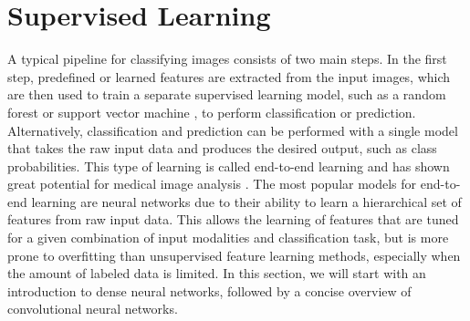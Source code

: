 

\section{Supervised Learning}


A typical pipeline for classifying images consists of two main steps. In the
first step, predefined or learned features are extracted from the input images,
which are then used to train a separate supervised learning model, such as a
random forest \citep{breiman2001} or support vector machine \citep{cortes1995},
to perform classification or prediction. Alternatively, classification and
prediction can be performed with a single model that takes the raw input data
and produces the desired output, such as class probabilities. This type of
learning is called end-to-end learning and has shown great potential for medical
image analysis \citep{ciresan2012}. The most popular models for end-to-end
learning are neural networks due to their ability to learn a hierarchical set of
features from raw input data. This allows the learning of features that are
tuned for a given combination of input modalities and classification task, but
is more prone to overfitting than unsupervised feature learning methods,
especially when the amount of labeled data is limited. In this section, we will
start with an introduction to dense neural networks, followed by a concise
overview of convolutional neural networks.


